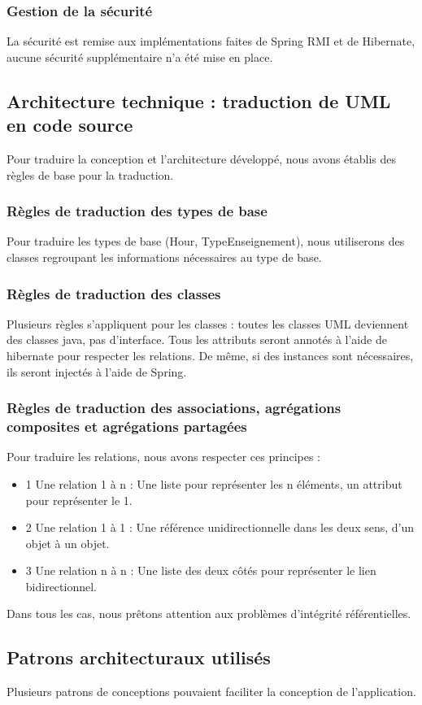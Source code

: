 \documentclass[a4paper,11pt]{article}
\newcommand{\br}{\\\mbox{}}
\begin{document}
\subsubsection{Gestion de la sécurité}
La sécurité est remise aux implémentations faites de Spring RMI et de Hibernate, aucune sécurité supplémentaire n'a été mise en place.
\subsection{Architecture technique : traduction de UML en code source}
Pour traduire la conception et l'architecture développé, nous avons établis des règles de base pour la traduction.
\subsubsection{Règles de traduction des types de base}
Pour traduire les types de base (Hour, TypeEnseignement), nous utiliserons des classes regroupant les informations nécessaires au type de base.
\subsubsection{Règles de traduction des classes}
Plusieurs règles s'appliquent pour les classes : toutes les classes UML deviennent des classes java, pas d'interface. Tous les attributs seront annotés à l'aide de hibernate pour respecter les relations. De même, si des instances sont nécessaires, ils seront injectés à l'aide de Spring.
\subsubsection{Règles de traduction des associations, agrégations composites et agrégations partagées}
Pour traduire les relations, nous avons respecter ces principes :\br
\begin{itemize}
\item 1 Une relation 1 à n : Une liste pour représenter les n éléments, un attribut pour représenter le 1. 
\item 2 Une relation 1 à 1 : Une référence unidirectionnelle dans les deux sens, d'un objet à un objet.
\item 3 Une relation n à n : Une liste des deux côtés pour représenter le lien bidirectionnel.
\end{itemize}
Dans tous les cas, nous prêtons attention aux problèmes d'intégrité référentielles.

\subsection{Patrons architecturaux utilisés}
Plusieurs patrons de conceptions pouvaient faciliter la conception de l'application.
\end{document}
